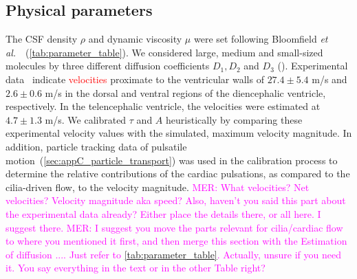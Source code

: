 \documentclass[fleqn]{wlscirep}
\newcommand{\mer}[1]{\textcolor{magenta}{#1}}
\newcommand{\fixme}[1]{\textcolor{red}{#1}}
\begin{document}
\subsection*{Physical parameters}
The CSF density $\rho$ and dynamic viscosity $\mu$ were set following Bloomfield \textit{et al.}~\cite{Bloomfield1998EffectsFluid}~(\cref{tab:parameter_table}). We considered large, medium and small-sized molecules by three different diffusion coefficients $D_1, D_2$ and $D_3$ (). Experimental data~\cite{Olstad2019CiliaryDevelopment} indicate \fixme{velocities} proximate to the ventricular walls of $27.4 \pm 5.4$ \textmu m/s and $2.6 \pm 0.6$ \textmu m/s in the dorsal and ventral regions of the diencephalic ventricle, respectively. In the telencephalic ventricle, the velocities were estimated at $4.7 \pm 1.3$ \textmu m/s. We calibrated $\tau$ and $A$ heuristically by comparing these experimental velocity values with the simulated, maximum velocity magnitude. In addition, particle tracking data of pulsatile motion~(\cref{sec:appC_particle_transport}) was used in the calibration process to determine the relative contributions of the cardiac pulsations, as compared to the cilia-driven flow, to the velocity magnitude.
\mer{MER: What velocities? Net velocities? Velocity magnitude aka speed? Also, haven't you said this part about the experimental data already? Either place the details there, or all here. I suggest there.}
\mer{MER: I suggest you move the parts relevant for cilia/cardiac flow to where you mentioned it first, and then merge this section with the Estimation of diffusion .... Just refer to \cref{tab:parameter_table}. Actually, unsure if you need it. You say everything in the text or in the other Table right?}
\end{document}
